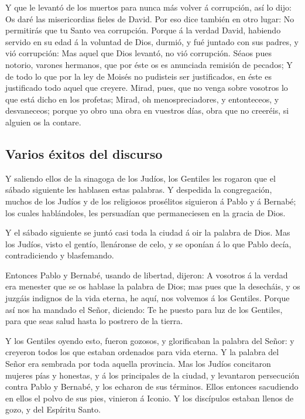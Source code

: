  Y que le levantó de los muertos para nunca más volver á
corrupción, así lo dijo: Os daré las misericordias fieles de David.
 Por eso dice también en otro lugar: No permitirás que tu
Santo vea corrupción.  Porque á la verdad David, habiendo
servido en su edad á la voluntad de Dios, durmió, y fué juntado con sus
padres, y vió corrupción:  Mas aquel que Dios levantó, no
vió corrupción.  Séaos pues notorio, varones hermanos, que
por éste os es anunciada remisión de pecados;  Y de todo lo
que por la ley de Moisés no pudisteis ser justificados, en éste es
justificado todo aquel que creyere.  Mirad, pues, que no
venga sobre vosotros lo que está dicho en los profetas; 
Mirad, oh menospreciadores, y entonteceos, y desvaneceos; porque yo obro
una obra en vuestros días, obra que no creeréis, si alguien os la
contare.

\hypertarget{varios-uxe9xitos-del-discurso}{%
\subsection{Varios éxitos del
discurso}\label{varios-uxe9xitos-del-discurso}}

 Y saliendo ellos de la sinagoga de los Judíos, los
Gentiles les rogaron que el sábado siguiente les hablasen estas
palabras.  Y despedida la congregación, muchos de los
Judíos y de los religiosos prosélitos siguieron á Pablo y á Bernabé; los
cuales hablándoles, les persuadían que permaneciesen en la gracia de
Dios.

 Y el sábado siguiente se juntó casi toda la ciudad á oir
la palabra de Dios.  Mas los Judíos, visto el gentío,
llenáronse de celo, y se oponían á lo que Pablo decía, contradiciendo y
blasfemando.

 Entonces Pablo y Bernabé, usando de libertad, dijeron: A
vosotros á la verdad era menester que se os hablase la palabra de Dios;
mas pues que la desecháis, y os juzgáis indignos de la vida eterna, he
aquí, nos volvemos á los Gentiles.  Porque así nos ha
mandado el Señor, diciendo: Te he puesto para luz de los Gentiles, para
que seas salud hasta lo postrero de la tierra.

 Y los Gentiles oyendo esto, fueron gozosos, y glorificaban
la palabra del Señor: y creyeron todos los que estaban ordenados para
vida eterna.  Y la palabra del Señor era sembrada por toda
aquella provincia.  Mas los Judíos concitaron mujeres pías
y honestas, y á los principales de la ciudad, y levantaron persecución
contra Pablo y Bernabé, y los echaron de sus términos. 
Ellos entonces sacudiendo en ellos el polvo de sus pies, vinieron á
Iconio.  Y los discípulos estaban llenos de gozo, y del
Espíritu Santo.

